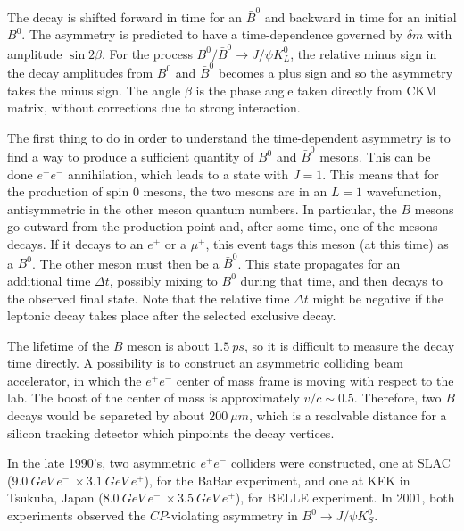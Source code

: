 \documentclass[../../main/main.tex]{subfiles}
\begin{document}


The decay is shifted forward in time for an \( \bar{B}^0 \) and backward in time for an initial \( B^0 \). The asymmetry is predicted to have a time-dependence governed by \( \delta m \) with amplitude \( \sin 2\beta \). For the process \( B^0/\bar{B}^0 \rightarrow J/\psi K^0_L \), the relative minus sign in the decay amplitudes from \( B^0 \) and \( \bar{B}^0 \) becomes a plus sign and so the asymmetry takes the minus sign. The angle \( \beta \) is the phase angle taken directly from CKM matrix, without corrections due to strong interaction.

The first thing to do in order to understand the time-dependent asymmetry is to find a way to produce a sufficient quantity of \( B^0 \) and \( \bar{B}^0 \) mesons. This can be done \( e^+e^- \) annihilation, which leads to a state with \( J=1 \). This means that for the production of spin 0 mesons, the two mesons are in an \( L=1 \) wavefunction, antisymmetric in the other meson quantum numbers. In particular, the \( B \) mesons go outward from the production point and, after some time, one of the mesons decays. If it decays to an \( e^+ \) or a \( \mu^+ \), this event tags this meson (at this time) as a \( B^0 \). The other meson must then be a \( \bar{B}^0 \). This state propagates for an additional time \( \Delta t \), possibly mixing to \( B^0 \) during that time, and then decays to the observed final state. Note that the relative time \( \Delta t \) might be negative if the leptonic decay takes place after the selected exclusive decay.


The lifetime of the \( B \) meson is about \( 1.5 \ \si{ps} \), so it is difficult to measure the decay time directly. A possibility is to construct an asymmetric colliding beam accelerator, in which the \( e^+e^- \) center of mass frame is moving with respect to the lab. The boost of the center of mass is approximately \( v/c \sim 0.5 \). Therefore, two \( B \) decays would be separeted by about \( 200 \ \si{\mu m} \), which is a resolvable distance for a silicon tracking detector which pinpoints the decay vertices.

In the late 1990's, two asymmetric \( e^+e^- \) colliders were constructed, one at SLAC (\( 9.0 \ \si{GeV} \ e^- \ \times 3.1 \ \si{GeV} \ e^+ \)), for the BaBar experiment, and one at KEK in Tsukuba, Japan (\( 8.0 \ \si{GeV} \ e^- \ \times 3.5 \ \si{GeV} \ e^+ \)), for BELLE experiment. In 2001, both experiments observed the \( CP \)-violating asymmetry in \( B^0 \rightarrow J/\psi K^0_S \).
\end{document}
